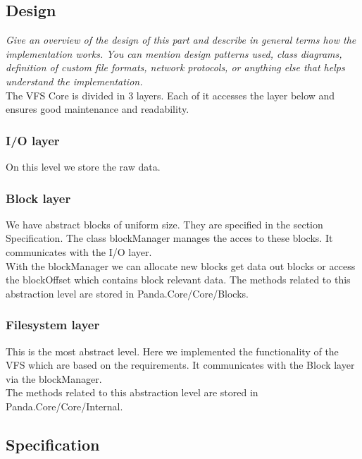 \documentclass[a4paper,12pt]{article}
\begin{document}
\subsection{Design}

\emph{Give an overview of the design of this part and describe in general terms how the implementation works. You can mention design patterns used, class diagrams, definition of custom file formats, network protocols, or anything else that helps understand the implementation.}\\

The VFS Core is divided in 3 layers. Each of it accesses the layer below and ensures good maintenance and readability.

\subsubsection{I/O layer}

On this level we store the raw data.

\subsubsection{Block layer}

We have abstract blocks of uniform size. They are specified in the section Specification. The class blockManager manages the acces to these blocks. It communicates with the I/O layer.\\

With the blockManager we can allocate new blocks get data out blocks or access the blockOffset which contains block relevant data. The methods related to this abstraction level are stored in Panda.Core/Core/Blocks.

\subsubsection{Filesystem layer}

This is the most abstract level. Here we implemented the functionality of the VFS which are based on the requirements. It communicates with the Block layer via the blockManager.\\

The methods related to this abstraction level are stored in \newline Panda.Core/Core/Internal.

\subsection{Specification}
\end{document}

